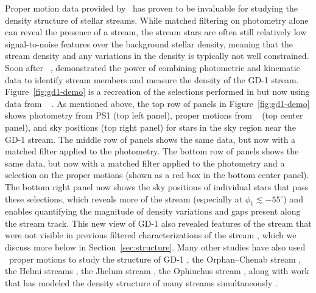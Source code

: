 \documentclass[final,5p,times,twocolumn,authoryear]{elsarticle}
\begin{document}
Proper motion data provided by \gaia\ has proven to be invaluable for studying the
density structure of stellar streams.
While matched filtering on photometry alone can reveal the presence of a stream, the
stream stars are often still relatively low signal-to-noise features over the background
stellar density, meaning that the stream density and any variations in the density is
typically not well constrained.
Soon after \gaia\ , \citet{price-whelan:2018} demonstrated the power of combining
photometric and kinematic data to identify stream members and measure the density of the
GD-1 stream.
Figure~\ref{fig:gd1-demo} is a recreation of the selections performed in
\citet{price-whelan:2018} but now using data from \gaia\  \citep{gaiadr3}.
As mentioned above, the top row of panels in Figure~\ref{fig:gd1-demo} shows photometry
from PS1 (top left panel), proper motions from \gaia\  (top center panel), and sky
positions (top right panel) for stars in the sky region near the GD-1 stream.
The middle row of panels shows the same data, but now with a matched filter applied to
the photometry.
The bottom row of panels shows the same data, but now with a matched filter applied to
the photometry and a selection on the proper motions (shown as a red box in the bottom
center panel).
The bottom right panel now shows the sky positions of individual stars that pass these
selections, which reveals more of the stream (especially at $\phi_1 \lesssim -55^\circ$)
and enables quantifying the magnitude of density variations and gaps present along the
stream track.
This new view of GD-1 also revealed features of the stream that were not visible in
previous filtered characterizations of the stream \citep{Grillmair:2006-gd1,
koposov:2010, deboer:2018}, which we discuss more below in Section~\ref{sec:structure}.
Many other studies have also used \gaia\ proper motions to study the structure of GD-1
\citep[e.g.,][]{malhan:2018, li-yanny:2018, huang:2019, deboer:2020, ibata:2020}, the
Orphan--Chenab stream \citep{koposov:2019}, the Helmi streams \citep{koppelman:2019},
the Jhelum stream \citep{bonaca:2019}, the Ophiuchus stream \citep{caldwell:2020}, along
with work that has modeled the density structure of many streams simultaneously
\citep[e.g.,][]{patrick:2022}.
\end{document}
